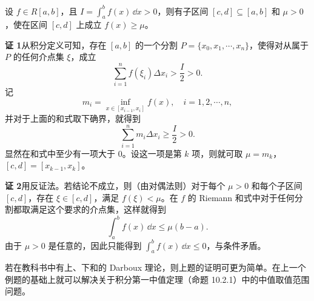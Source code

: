 \begin{xexample}[10.2.1]
设 $f\in R[a,b]$，且 $I=\int_a^b f(x)\,\dd x>0$，则有子区间 $[c,d]\subseteq[a,b]$ 和 $\mu>0$，使在区间 $[c,d]$ 上成立 $f(x)\geqslant\mu$。
\end{xexample}
\begin{xsolution}
\textbf{证 1}\quad 从积分定义可知，存在 $[a,b]$ 的一个分割 $P=\{x_0,x_1,\cdots,x_n\}$，使得对从属于 $P$ 的任何介点集 $\xi$，成立
\[
  \sum_{i=1}^n f(\xi_i)\Delta x_i>\frac I2>0.
\]
记
\[
  m_i=\inf_{x\in[x_{i-1},x_i]}f(x),\quad i=1,2,\cdots,n,
\]
并对于上面的和式取下确界，就得到
\[
  \sum_{i=1}^n m_i\Delta x_i\geqslant\frac I2>0.
\]
显然在和式中至少有一项大于 0。设这一项是第 $k$ 项，则就可取 $\mu=m_k$，$[c,d]=[x_{k-1},x_k]$。

\textbf{证 2}\quad 用反证法。若结论不成立，则（由对偶法则）对于每个 $\mu>0$ 和每个子区间 $[c,d]$，存在 $\xi\in[c,d]$，满足 $f(\xi)<\mu$。在 $f$ 的 Riemann 和式中对于任何分割都取满足这个要求的介点集，这样就得到
\[
  \int_a^b f(x)\,\dd x\leqslant\mu(b-a).
\]
由于 $\mu>0$ 是任意的，因此只能得到 $\int_a^b f(x)\,\dd x\leqslant0$，与条件矛盾。
\end{xsolution}


\begin{xremark}
若在教科书中有上、下和的 Darboux 理论，则上题的证明可更为简单。在上一个例题的基础上就可以解决关于积分第一中值定理（命题 10.2.1）中的中值取值范围问题。
\end{xremark}

